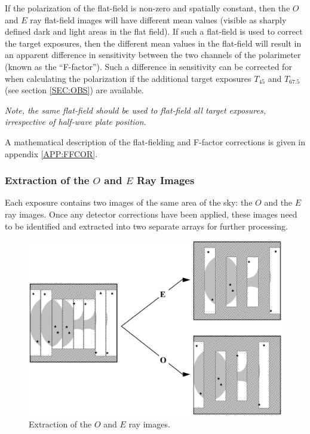 \documentclass[twoside,11pt]{article}
\newcommand{\hyperref}[4]{#2\ref{#4}#3}
\newenvironment{latexonly}{}{}
\renewcommand{\_}{\texttt{\symbol{95}}}
\begin{document}
If the polarization of the flat-field is non-zero and spatially constant,
then the $O$ and $E$ ray flat-field images will have different mean
values (visible as sharply defined dark and light areas in the flat
field). If such a flat-field is used to correct the target exposures,
then the different mean values in the flat-field will result in an
apparent difference in sensitivity between the two channels of the
polarimeter (known as the ``F-factor''). Such a difference in sensitivity
can be corrected for when calculating the polarization if the additional
target exposures \hyperref{$T_{45}$ and $T_{67.5}$}{$T_{45}$ and
$T_{67.5}$ (see section }{)}{SEC:OBS} are available. 

\emph{Note, the same flat-field should be used to flat-field all target
exposures, irrespective of half-wave plate position.}

A mathematical description of the flat-fielding and F-factor corrections
is given \hyperref{here}{in appendix }{}{APP:FFCOR}.

\subsubsection{Extraction of the $O$ and $E$ Ray Images}
Each exposure contains two images of the same area of the sky: the $O$
and the $E$ ray images. Once any detector corrections have been applied,
these images need to be identified and extracted into two separate arrays for
further processing.

\begin{latexonly}
  \vspace{5mm}
  \begin{figure}[htbp]
  \begin{center}
  \includegraphics[clip,scale=0.5]{sun223_figures/extract.eps}
  \caption{Extraction of the $O$ and $E$ ray images.}
  \label{fig:extract}
  \end{center}
  \end{figure}
\end{latexonly}
\end{document}
